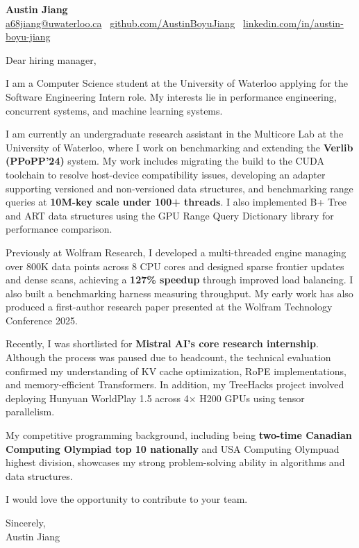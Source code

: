 \documentclass[11pt]{letter}
\begin{document}
{\Large \textbf{Austin Jiang}}\\
\href{mailto:a68jiang@uwaterloo.ca}{a68jiang@uwaterloo.ca} \textbar\ 
\href{https://github.com/AustinBoyuJiang}{github.com/AustinBoyuJiang} \textbar\ 
\href{https://www.linkedin.com/in/austin-boyu-jiang}{linkedin.com/in/austin-boyu-jiang}

\vspace{0.8em}

Dear hiring manager,

I am a Computer Science student at the University of Waterloo applying for the Software Engineering Intern role. My interests lie in performance engineering, concurrent systems, and machine learning systems.

I am currently an undergraduate research assistant in the Multicore Lab at the University of Waterloo, where I work on benchmarking and extending the \textbf{Verlib (PPoPP’24)} system. My work includes migrating the build to the CUDA toolchain to resolve host-device compatibility issues, developing an adapter supporting versioned and non-versioned data structures, and benchmarking range queries at \textbf{10M-key scale under 100+ threads}. I also implemented B+ Tree and ART data structures using the GPU Range Query Dictionary library for performance comparison.

Previously at Wolfram Research, I developed a multi-threaded engine managing over 800K data points across 8 CPU cores and designed sparse frontier updates and dense scans, achieving a \textbf{127\% speedup} through improved load balancing. I also built a benchmarking harness measuring throughput. My early work has also produced a first-author research paper presented at the Wolfram Technology Conference 2025.

Recently, I was shortlisted for \textbf{Mistral AI’s core research internship}. Although the process was paused due to headcount, the technical evaluation confirmed my understanding of KV cache optimization, RoPE implementations, and memory-efficient Transformers. In addition, my TreeHacks project involved deploying Hunyuan WorldPlay 1.5 across 4× H200 GPUs using tensor parallelism.

My competitive programming background, including being \textbf{two-time Canadian Computing Olympiad top 10 nationally} and USA Computing Olympuad highest division, showcases my strong problem-solving ability in algorithms and data structures.

I would love the opportunity to contribute to your team.

Sincerely,\\
Austin Jiang
\end{document}
